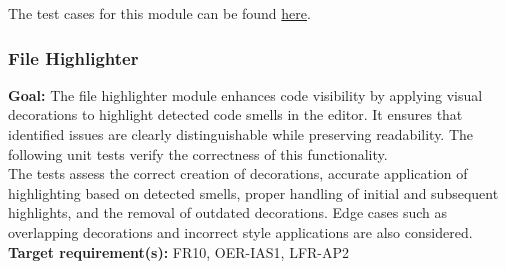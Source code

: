 \documentclass[12pt, titlepage]{article}
\begin{document}
  \noindent The test cases for this module can be found
  \href{https://github.com/ssm-lab/capstone--sco-vs-code-plugin/blob/plugin-multi-file/test/utils/hashDocs.test.ts}{here}.

  \subsubsection{File Highlighter}

  \textbf{Goal:} The file highlighter module enhances code visibility
  by applying visual decorations to highlight detected code smells in
  the editor. It ensures that identified issues are clearly
  distinguishable while preserving readability. The following unit
  tests verify the correctness of this functionality.\\

  \noindent The tests assess the correct creation of decorations,
  accurate application of highlighting based on detected smells,
  proper handling of initial and subsequent highlights, and the
  removal of outdated decorations. Edge cases such as overlapping
  decorations and incorrect style applications are also considered.\\

  \noindent\textbf{Target requirement(s):} FR10, OER-IAS1, LFR-AP2~\cite{SRS} \\
\end{document}
